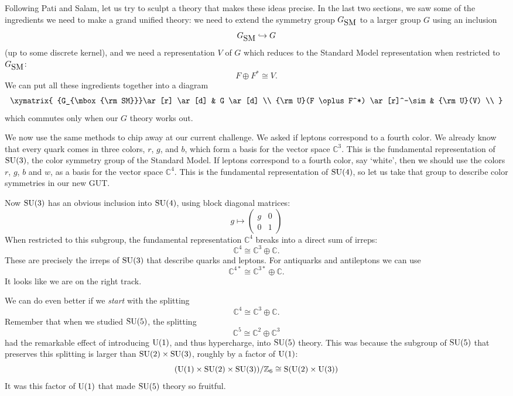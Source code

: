 \documentclass[12pt]{article}
\newcommand{\C}{{\mathbb C}}  %
\newcommand{\Z}{{\mathbb Z}}  %
\newcommand{\U}{{\rm U}}    %
\renewcommand{\S}{{\rm S}}    %
\newcommand{\SU}{{\rm SU}}    %
\newcommand{\inclusion}{\hookrightarrow}
\newcommand{\iso}{\cong} %
\newcommand{\GSM}{{G_{\mbox{\rm SM}}}}  %
\begin{document}
Following Pati and Salam, let us try to sculpt a theory that makes
these ideas precise.  In the last two sections, we saw some of the
ingredients we need to make a grand unified theory: we need to extend
the symmetry group $\GSM$ to a larger group $G$ using an inclusion
\[ \GSM \inclusion G \]
(up to some discrete kernel), and we need a representation $V$ of $G$ which
reduces to the Standard Model representation when restricted to $\GSM$:
\[ F \oplus F^* \iso V. \]
We can put all these ingredients together into a diagram
\[
\xymatrix{
	\GSM \ar[r] \ar[d] & G \ar[d] \\
	\U(F \oplus F^*) \ar[r]^-\sim    & \U(V)   \\
}
\]
which commutes only when our $G$ theory works out.

We now use the same methods to chip away at our current challenge.  We
asked if leptons correspond to a fourth color.  We already know that
every quark comes in three colors, $r$, $g$, and $b$, which form a basis 
for the vector space $\C^3$.  This is the fundamental representation 
of $\SU(3)$, the color symmetry group of the Standard Model.  If leptons 
correspond to a fourth color, say `white', then we should use the colors 
$r$, $g$, $b$ and $w$, as a basis for the vector space $\C^4$.  This is the 
fundamental representation of $\SU(4)$, so let us take that group to
describe color symmetries in our new GUT.

Now $\SU(3)$ has an obvious inclusion into $\SU(4)$, using block 
diagonal matrices:
\[ g \mapsto 
\left(
\begin{array}{cc}
	g & 0 \\
	0 & 1
\end{array}
\right)
\]
When restricted to this subgroup, the fundamental 
representation $\C^4$ breaks into a direct sum of irreps:
\[ \C^4 \iso \C^3 \oplus \C. \]
These are precisely the irreps of $\SU(3)$ that describe
quarks and leptons.  For antiquarks and antileptons we can use
\[ \C^{4*} \iso \C^{3*} \oplus \C. \]
It looks like we are on the right track.

We can do even better if we \emph{start} with the splitting 
\[     \C^4 \iso \C^3 \oplus \C.   \]
Remember that when we studied $\SU(5)$, the splitting 
\[ \C^5 \iso \C^2 \oplus \C^3 \]
had the remarkable effect of introducing $\U(1)$, and thus hypercharge, into
$\SU(5)$ theory.  This was because the subgroup of 
$\SU(5)$ that preserves this splitting is larger than $\SU(2) \times
\SU(3)$, roughly by a factor of $\U(1)$:
\[ (\U(1) \times \SU(2) \times \SU(3)) / \Z_6 \iso \S(\U(2) \times \U(3)) \]
It was this factor of $\U(1)$ that made $\SU(5)$ theory so fruitful.
\end{document}

